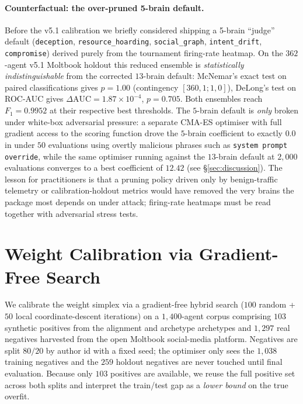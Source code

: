 \documentclass{article}
\begin{document}
\paragraph{Counterfactual: the over-pruned 5-brain default.}
Before the v5.1 calibration we briefly considered shipping a
5-brain ``judge'' default (\texttt{deception},
\texttt{resource\_hoarding}, \texttt{social\_graph},
\texttt{intent\_drift}, \texttt{compromise}) derived purely from
the tournament firing-rate heatmap. On the $362$-agent v5.1 Moltbook
holdout this reduced ensemble is \emph{statistically
indistinguishable} from the corrected $13$-brain default: McNemar's
exact test on paired classifications gives $p=1.00$ (contingency
$[360,1;1,0]$), DeLong's test on ROC-AUC gives
$\Delta\mathrm{AUC}=1.87\!\times\!10^{-4}$, $p=0.705$. Both ensembles
reach $F_1=0.9952$ at their respective best thresholds. The $5$-brain
default is \emph{only} broken under white-box adversarial pressure:
a separate CMA-ES optimiser with full gradient access to the scoring
function drove the $5$-brain coefficient to exactly $0.0$ in under
$50$ evaluations using overtly malicious phrases such as
\texttt{system prompt override}, while the same optimiser running
against the $13$-brain default at $2{,}000$ evaluations converges to
a best coefficient of $12.42$ (see \S\ref{sec:discussion}). The
lesson for practitioners is that a pruning policy driven only by
benign-traffic telemetry or calibration-holdout metrics would have
removed the very brains the package most depends on under attack;
firing-rate heatmaps must be read together with adversarial stress
tests.

\section{Weight Calibration via Gradient-Free Search}
\label{sec:calibration}

We calibrate the weight simplex via a gradient-free hybrid search
($100$ random + $50$ local coordinate-descent iterations) on a
$1{,}400$-agent corpus comprising $103$ synthetic positives from the
alignment and archetype archetypes and $1{,}297$ real negatives
harvested from the open Moltbook social-media platform. Negatives are
split $80/20$ by author id with a fixed seed; the optimiser only sees
the $1{,}038$ training negatives and the $259$ holdout negatives are
never touched until final evaluation. Because only $103$ positives are
available, we reuse the full positive set across both splits and
interpret the train/test gap as a \emph{lower bound} on the true
overfit.
\end{document}
